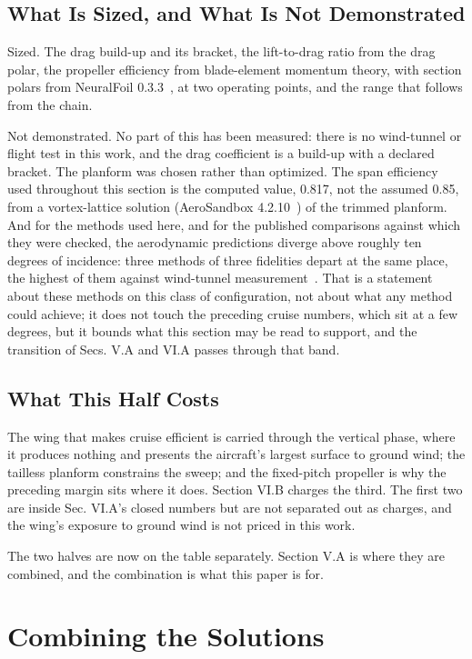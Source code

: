 \documentclass[journal]{new-aiaa}
\begin{document}
\subsection{What Is Sized, and What Is Not Demonstrated}

Sized. The drag build-up and its bracket, the lift-to-drag ratio from the drag polar, the propeller efficiency from blade-element momentum theory, with section polars from NeuralFoil 0.3.3~\cite{r19}, at two operating points, and the range that follows from the chain.

Not demonstrated. No part of this has been measured: there is no wind-tunnel or flight test in this work, and the drag coefficient is a build-up with a declared bracket. The planform was chosen rather than optimized. The span efficiency used throughout this section is the computed value, 0.817, not the assumed 0.85, from a vortex-lattice solution (AeroSandbox 4.2.10~\cite{r20}) of the trimmed planform. And for the methods used here, and for the published comparisons against which they were checked, the aerodynamic predictions diverge above roughly ten degrees of incidence: three methods of three fidelities depart at the same place, the highest of them against wind-tunnel measurement~\cite{r21,r22}. That is a statement about these methods on this class of configuration, not about what any method could achieve; it does not touch the preceding cruise numbers, which sit at a few degrees, but it bounds what this section may be read to support, and the transition of Secs. V.A and VI.A passes through that band.

\subsection{What This Half Costs}

The wing that makes cruise efficient is carried through the vertical phase, where it produces nothing and presents the aircraft's largest surface to ground wind; the tailless planform constrains the sweep; and the fixed-pitch propeller is why the preceding margin sits where it does. Section VI.B charges the third. The first two are inside Sec. VI.A's closed numbers but are not separated out as charges, and the wing's exposure to ground wind is not priced in this work.

The two halves are now on the table separately. Section V.A is where they are combined, and the combination is what this paper is for.

\section{Combining the Solutions}
\end{document}
